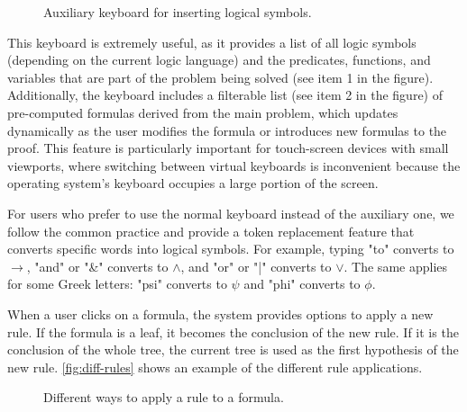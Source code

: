 \begin{figure}[h]
    \centering
    \caption{Auxiliary keyboard for inserting logical symbols.}
    \label{fig:aux-keyboard}
\end{figure}

This keyboard is extremely useful, as it provides a list of all logic symbols (depending on the current logic language) and the predicates, functions, and variables that are part of the problem being solved (see item 1 in the figure). Additionally, the keyboard includes a filterable list (see item 2 in the figure) of pre-computed formulas derived from the main problem, which updates dynamically as the user modifies the formula or introduces new formulas to the proof. This feature is particularly important for touch-screen devices with small viewports, where switching between virtual keyboards is inconvenient because the operating system's keyboard occupies a large portion of the screen.

For users who prefer to use the normal keyboard instead of the auxiliary one, we follow the common practice and provide a token replacement feature that converts specific words into logical symbols. For example, typing "to" converts to \(\to\), "and" or "\&" converts to \(\land\), and "or" or "|" converts to \(\lor\). The same applies for some Greek letters: "psi" converts to \(\psi\) and "phi" converts to \(\phi\).

When a user clicks on a formula, the system provides options to apply a new rule. If the formula is a leaf, it becomes the conclusion of the new rule. If it is the conclusion of the whole tree, the current tree is used as the first hypothesis of the new rule. \autoref{fig:diff-rules} shows an example of the different rule applications.

\begin{figure}[h]
    \centering
    \caption{Different ways to apply a rule to a formula.}
    \label{fig:diff-rules}
\end{figure}

